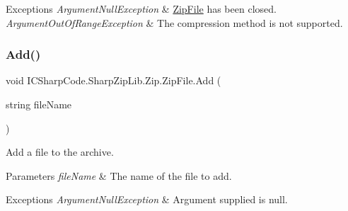 \begin{DoxyExceptions}{Exceptions}
{\em Argument\+Null\+Exception} & \hyperlink{class_i_c_sharp_code_1_1_sharp_zip_lib_1_1_zip_1_1_zip_file}{Zip\+File} has been closed.\\
\hline
{\em Argument\+Out\+Of\+Range\+Exception} & The compression method is not supported.\\
\hline
\end{DoxyExceptions}
\mbox{\label{class_i_c_sharp_code_1_1_sharp_zip_lib_1_1_zip_1_1_zip_file_aebba11ba220d3dcebf6261227d7d9740}} 
\subsubsection{\texorpdfstring{Add()}{Add()}\hspace{0.1cm}{\footnotesize\ttfamily [3/8]}}
{\footnotesize\ttfamily void I\+C\+Sharp\+Code.\+Sharp\+Zip\+Lib.\+Zip.\+Zip\+File.\+Add (\begin{DoxyParamCaption}\item[{string}]{file\+Name }\end{DoxyParamCaption})\hspace{0.3cm}{\ttfamily [inline]}}



Add a file to the archive. 


\begin{DoxyParams}{Parameters}
{\em file\+Name} & The name of the file to add.\\
\hline
\end{DoxyParams}

\begin{DoxyExceptions}{Exceptions}
{\em Argument\+Null\+Exception} & Argument supplied is null.\\
\hline
\end{DoxyExceptions}
\mbox{\label{class_i_c_sharp_code_1_1_sharp_zip_lib_1_1_zip_1_1_zip_file_a4d313fdf4e6a95365878531ddb876bec}} 

